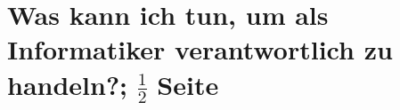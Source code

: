 \documentclass[a4paper, 11pt]{scrartcl}
\begin{document}
\newpage

\section{Was kann ich tun, um als Informatiker verantwortlich zu handeln?; $\frac{1}{2}$ Seite}

\cite{fitzgerald:realigning_research_and_practice}














% 

% 
\end{document}
